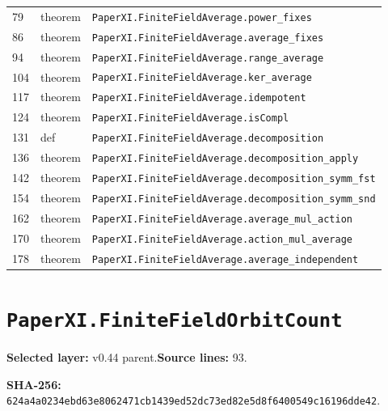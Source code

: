 \documentclass[10pt,oneside]{book}
\begin{document}
\begin{longtable}{@{}p{}p{}p{}@{}}
79&theorem&\nolinkurl{PaperXI.FiniteFieldAverage.power_fixes}\\

86&theorem&\nolinkurl{PaperXI.FiniteFieldAverage.average_fixes}\\

94&theorem&\nolinkurl{PaperXI.FiniteFieldAverage.range_average}\\

104&theorem&\nolinkurl{PaperXI.FiniteFieldAverage.ker_average}\\

117&theorem&\nolinkurl{PaperXI.FiniteFieldAverage.idempotent}\\

124&theorem&\nolinkurl{PaperXI.FiniteFieldAverage.isCompl}\\

131&def&\nolinkurl{PaperXI.FiniteFieldAverage.decomposition}\\

136&theorem&\nolinkurl{PaperXI.FiniteFieldAverage.decomposition_apply}\\

142&theorem&\nolinkurl{PaperXI.FiniteFieldAverage.decomposition_symm_fst}\\

154&theorem&\nolinkurl{PaperXI.FiniteFieldAverage.decomposition_symm_snd}\\

162&theorem&\nolinkurl{PaperXI.FiniteFieldAverage.average_mul_action}\\

170&theorem&\nolinkurl{PaperXI.FiniteFieldAverage.action_mul_average}\\

178&theorem&\nolinkurl{PaperXI.FiniteFieldAverage.average_independent}\\

\bottomrule\end{longtable}

\section{\texorpdfstring{\nolinkurl{PaperXI.FiniteFieldOrbitCount}}{PaperXI.FiniteFieldOrbitCount}}\label{module:PaperXI.FiniteFieldOrbitCount}

\textbf{Selected layer:} v0.44 parent.\quad\textbf{Source lines:} 93.\par\textbf{SHA-256:} {\scriptsize\nolinkurl{624a4a0234ebd63e8062471cb1439ed52dc73ed82e5d8f6400549c16196dde42}}.
\end{document}
